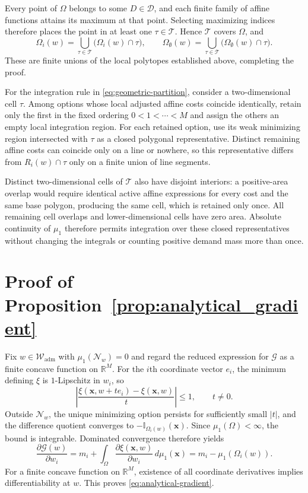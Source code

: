 \documentclass[a4paper,fleqn]{cas-sc}
\theoremstyle{remark}
\theoremstyle{plain}
\begin{document}
Every point of $\Omega$ belongs to some $D\in\mathcal D$, and each finite family of affine functions attains its maximum at that point. Selecting maximizing indices therefore places the point in at least one $\tau\in\mathcal T$. Hence $\mathcal T$ covers $\Omega$, and
\[
    \Omega_i(w)=\bigcup_{\tau\in\mathcal T}\bigl(\Omega_i(w)\cap\tau\bigr),\qquad \Omega_\emptyset(w)=\bigcup_{\tau\in\mathcal T}\bigl(\Omega_\emptyset(w)\cap\tau\bigr).
\]
These are finite unions of the local polytopes established above, completing the proof.

For the integration rule in \eqref{eq:geometric-partition}, consider a two-dimensional cell $\tau$. Among options whose local adjusted affine costs coincide identically, retain only the first in the fixed ordering $0<1<\cdots<M$ and assign the others an empty local integration region. For each retained option, use its weak minimizing region intersected with $\tau$ as a closed polygonal representative. Distinct remaining affine costs can coincide only on a line or nowhere, so this representative differs from $R_i(w)\cap\tau$ only on a finite union of line segments.

Distinct two-dimensional cells of $\mathcal T$ also have disjoint interiors: a positive-area overlap would require identical active affine expressions for every cost and the same base polygon, producing the same cell, which is retained only once. All remaining cell overlaps and lower-dimensional cells have zero area. Absolute continuity of $\mu_1$ therefore permits integration over these closed representatives without changing the integrals or counting positive demand mass more than once.

\section{Proof of Proposition~\ref{prop:analytical_gradient}}
\label{app:gradient_proof}

Fix $w\in\mathcal W_{\mathrm{adm}}$ with $\mu_1(\mathcal N_w)=0$ and regard the reduced expression for $\mathcal G$ as a finite concave function on $\mathbb R^M$. For the $i$th coordinate vector $e_i$, the minimum defining $\xi$ is $1$-Lipschitz in $w_i$, so
\[
    \left|\frac{\xi(\bm x,w+t e_i)-\xi(\bm x,w)}{t}\right|\le1,\qquad t\ne0.
\]
Outside $\mathcal N_w$, the unique minimizing option persists for sufficiently small $|t|$, and the difference quotient converges to $-\mathbb I_{\Omega_i(w)}(\bm x)$. Since $\mu_1(\Omega)<\infty$, the bound is integrable. Dominated convergence therefore yields
\[
    \frac{\partial\mathcal G(w)}{\partial w_i}=m_i+\int_\Omega\frac{\partial\xi(\bm x,w)}{\partial w_i}\,d\mu_1(\bm x)=m_i-\mu_1(\Omega_i(w)).
\]
For a finite concave function on $\mathbb R^M$, existence of all coordinate derivatives implies differentiability at $w$. This proves \eqref{eq:analytical-gradient}.
\end{document}

